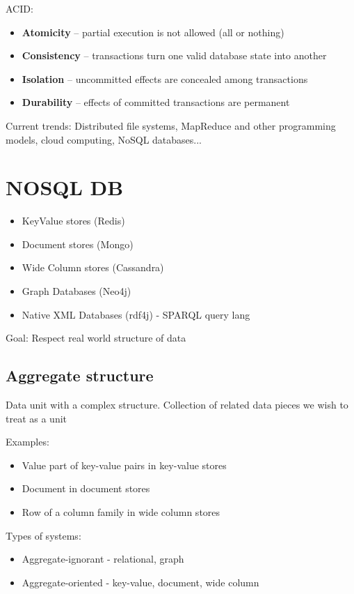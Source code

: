 ACID:
\begin{itemize}
    \item \textbf{Atomicity} – partial execution is not allowed (all or nothing)
    \item \textbf{Consistency} – transactions turn one valid database state into another
    \item \textbf{Isolation} – uncommitted effects are concealed among transactions
    \item \textbf{Durability} – effects of committed transactions are permanent
\end{itemize}

Current trends: Distributed file systems, MapReduce and other programming models, cloud computing, NoSQL databases...

\section{NOSQL DB}

\begin{itemize}
    \item KeyValue stores (Redis)
    \item Document stores (Mongo)
    \item Wide Column stores (Cassandra)
    \item Graph Databases (Neo4j)
    \item Native XML Databases (rdf4j) - SPARQL query lang
\end{itemize}

Goal: Respect real world structure of data

\subsection{Aggregate structure}
Data unit with a complex structure. Collection of related data pieces we wish to treat as a unit

Examples:
\begin{itemize}
    \item Value part of key-value pairs in key-value stores
    \item Document in document stores
    \item Row of a column family in wide column stores
\end{itemize}

Types of systems:
\begin{itemize}
    \item Aggregate-ignorant - relational, graph
    \item Aggregate-oriented - key-value, document, wide column
\end{itemize}

